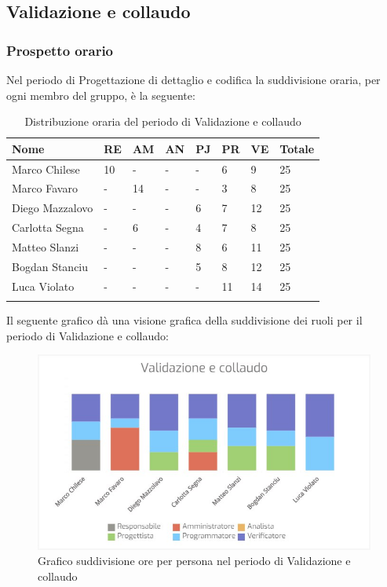 \newpage

\subsection{Validazione e collaudo}
\subsubsection{Prospetto orario}
Nel periodo di Progettazione di dettaglio e codifica la suddivisione oraria, per ogni membro del gruppo, è la seguente:

\begin{longtable}{|C{.30\textwidth}|C{.06\textwidth}|C{.06\textwidth}|C{.06\textwidth} | C{.06\textwidth}| C{.06\textwidth} | C{.06\textwidth} | C{.10\textwidth} |}
	\hline
	\textbf{Nome} & \textbf{RE} & \textbf{AM} & \textbf{AN} & \textbf{PJ} & \textbf{PR} & \textbf{VE} & \textbf{Totale}\\
	\hline 
	Marco Chilese & 10 & - & - & - & 6 & 9 & 25 \\
	\hline
	Marco Favaro &  - & 14 & - & - & 3 & 8 & 25 \\
	\hline
	Diego Mazzalovo & - & - & - & 6 & 7 & 12 & 25 \\
	\hline
	Carlotta Segna & - & 6 & - & 4 & 7 & 8 & 25 \\
	\hline
	Matteo Slanzi & - & - & - & 8 & 6 & 11 & 25 \\
	\hline
	Bogdan Stanciu & - & - & - & 5 & 8 & 12 & 25 \\
	\hline
	Luca Violato & - & - & - & - & 11 & 14 & 25 \\   
	\hline
	
	
	\caption{Distribuzione oraria del periodo di Validazione e collaudo}
	\label{Distribuzione oraria del periodo di Validazione e collaudo}
\end{longtable}

Il seguente grafico dà una visione grafica della suddivisione dei ruoli per il periodo di Validazione e collaudo:

\begin{figure}[H]
	\centering
	\includegraphics[width=1\linewidth]{./images/Bar_validazione_collaudo.png}
	\caption{Grafico suddivisione ore per persona nel periodo di Validazione e collaudo}
	\label{fig:grafico suddivione ruoli periodo di Validazione e collaudo}
\end{figure}

